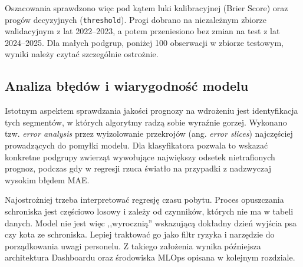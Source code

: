 Oszacowania sprawdzono więc pod kątem luki kalibracyjnej (Brier Score) oraz progów decyzyjnych (\texttt{threshold}). Progi dobrano na niezależnym zbiorze walidacyjnym z lat 2022--2023, a potem przeniesiono bez zmian na test z lat 2024--2025. Dla małych podgrup, poniżej 100 obserwacji w zbiorze testowym, wyniki należy czytać szczególnie ostrożnie.

\subsection{Analiza błędów i wiarygodność modelu}

Istotnym aspektem sprawdzania jakości prognozy na wdrożeniu jest identyfikacja tych segmentów, w których algorytmy radzą sobie wyraźnie gorzej. Wykonano tzw. \emph{error analysis} przez wyizolowanie przekrojów (ang. \emph{error slices}) najczęściej prowadzących do pomyłki modelu. Dla klasyfikatora pozwala to wskazać konkretne podgrupy zwierząt wywołujące największy odsetek nietrafionych prognoz, podczas gdy w regresji rzuca światło na przypadki z nadzwyczaj wysokim błędem MAE.



Najostrożniej trzeba interpretować regresję czasu pobytu. Proces opuszczania schroniska jest częściowo losowy i zależy od czynników, których nie ma w tabeli danych. Model nie jest więc ,,wyrocznią'' wskazującą dokładny dzień wyjścia psa czy kota ze schroniska. Lepiej traktować go jako filtr ryzyka i narzędzie do porządkowania uwagi personelu. Z takiego założenia wynika późniejsza architektura Dashboardu oraz środowiska MLOps opisana w kolejnym rozdziale.